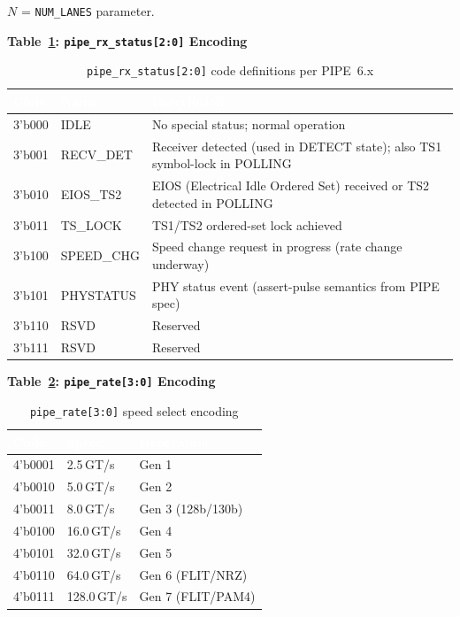 \documentclass[11pt,a4paper]{article}
\newcommand{\theadcell}[1]{%
  \cellcolor{tablehead}\textcolor{white}{\textbf{#1}}}
\begin{document}
\noindent $N$ = \texttt{NUM\_LANES} parameter.

\vspace{4mm}

\noindent\textbf{Table~\ref{tab:rxstatus}: \texttt{pipe\_rx\_status[2:0]} Encoding}
\begin{table}[h!]
\label{tab:rxstatus}
\centering
\begin{tabular}{llp{9cm}}
  \toprule
  \theadcell{Code} & \theadcell{Name} & \theadcell{Description} \\
  \midrule
  3'b000 & IDLE         & No special status; normal operation \\
  3'b001 & RECV\_DET    & Receiver detected (used in DETECT state); also TS1 symbol-lock in POLLING \\
  3'b010 & EIOS\_TS2    & EIOS (Electrical Idle Ordered Set) received or TS2 detected in POLLING \\
  3'b011 & TS\_LOCK     & TS1/TS2 ordered-set lock achieved \\
  3'b100 & SPEED\_CHG   & Speed change request in progress (rate change underway) \\
  3'b101 & PHYSTATUS    & PHY status event (assert-pulse semantics from PIPE spec) \\
  3'b110 & RSVD         & Reserved \\
  3'b111 & RSVD         & Reserved \\
  \bottomrule
\end{tabular}
\caption{\texttt{pipe\_rx\_status[2:0]} code definitions per PIPE~6.x}
\end{table}

\noindent\textbf{Table~\ref{tab:piperate}: \texttt{pipe\_rate[3:0]} Encoding}
\begin{table}[h!]
\label{tab:piperate}
\centering
\begin{tabular}{lll}
  \toprule
  \theadcell{Code} & \theadcell{Speed} & \theadcell{Generation} \\
  \midrule
  4'b0001 & 2.5\,GT/s  & Gen 1 \\
  4'b0010 & 5.0\,GT/s  & Gen 2 \\
  4'b0011 & 8.0\,GT/s  & Gen 3 (128b/130b) \\
  4'b0100 & 16.0\,GT/s & Gen 4 \\
  4'b0101 & 32.0\,GT/s & Gen 5 \\
  4'b0110 & 64.0\,GT/s & Gen 6 (FLIT/NRZ) \\
  4'b0111 & 128.0\,GT/s& Gen 7 (FLIT/PAM4) \\
  \bottomrule
\end{tabular}
\caption{\texttt{pipe\_rate[3:0]} speed select encoding}
\end{table}
\end{document}
